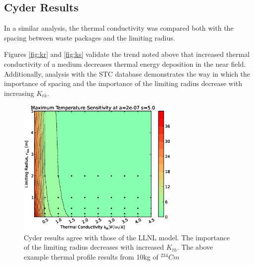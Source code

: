 \subsection{Cyder Results}

In a similar analysis, the thermal conductivity was compared both with the 
spacing between waste packages and the limiting radius. 

Figures \ref{fig:kr} and \ref{fig:ks} validate the trend noted above that 
increased thermal conductivity of a medium decreases thermal energy deposition 
in the near field.  Additionally, analysis with the \Cyder STC database 
demonstrates the way in which the importance of spacing and the importance of 
the limiting radius decrease with increasing $K_{th}$.

\begin{figure}[htbp!]
\begin{center}
\includegraphics[width=0.7\textwidth]{./chapters/demonstration/conductivity/kr.eps}
\end{center}
\caption[$K_{th}$ vs. $r_{lim}$ Sensitivity in Cyder]
{Cyder results agree with 
those of the LLNL model. The importance of the limiting radius decreases with 
increased $K_{th}$. The above example thermal profile results from 10kg of 
$^{234}Cm$}
\label{fig:Cm242Kth_alpha_high}
\end{figure}

